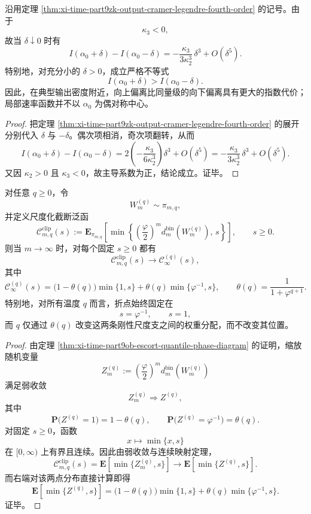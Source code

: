 \begin{corollary}[典型点附近的大偏差左右不对称性]\label{cor:xi-time-part9zk-local-rate-left-right-asymmetry}
沿用定理 \ref{thm:xi-time-part9zk-output-cramer-legendre-fourth-order} 的记号。由于
\[
\kappa_3<0,
\]
故当 \(\delta\downarrow 0\) 时有
\[
I(\alpha_0+\delta)-I(\alpha_0-\delta)
=
-\frac{\kappa_3}{3\kappa_2^3}\,\delta^3
+
O(\delta^5).
\]
特别地，对充分小的 \(\delta>0\)，成立严格不等式
\[
I(\alpha_0+\delta)>I(\alpha_0-\delta).
\]
因此，在典型输出密度附近，向上偏离比同量级的向下偏离具有更大的指数代价；局部速率函数并不以 \(\alpha_0\) 为偶对称中心。
\end{corollary}
\begin{proof}
把定理 \ref{thm:xi-time-part9zk-output-cramer-legendre-fourth-order} 的展开分别代入 \(\delta\) 与 \(-\delta\)。偶次项相消，奇次项翻转，从而
\[
I(\alpha_0+\delta)-I(\alpha_0-\delta)
=
2\left(-\frac{\kappa_3}{6\kappa_2^3}\right)\delta^3
+
O(\delta^5)
=
-\frac{\kappa_3}{3\kappa_2^3}\,\delta^3
+
O(\delta^5).
\]
又因 \(\kappa_2>0\) 且 \(\kappa_3<0\)，故主导系数为正，结论成立。证毕。
\end{proof}

\begin{theorem}\label{thm:xi-time-part9zk-escort-two-scale-clip-law}
对任意 \(q\ge 0\)，令
\[
W_m^{(q)}\sim \pi_{m,q},
\]
并定义尺度化截断泛函
\[
\mathcal C_{m,q}^{\mathrm{clip}}(s)
:=
\mathbf E_{\pi_{m,q}}\!\left[
\min\!\left\{
\left(\frac{\varphi}{2}\right)^m d_m^{\mathrm{bin}}(W_m^{(q)}),\,s
\right\}
\right],
\qquad
s\ge 0.
\]
则当 \(m\to\infty\) 时，对每个固定 \(s\ge 0\) 都有
\[
\mathcal C_{m,q}^{\mathrm{clip}}(s)
\longrightarrow
\mathcal C_\infty^{(q)}(s),
\]
其中
\[
\mathcal C_\infty^{(q)}(s)
=
\bigl(1-\theta(q)\bigr)\min\{1,s\}
+
\theta(q)\min\{\varphi^{-1},s\},
\qquad
\theta(q)=\frac{1}{1+\varphi^{q+1}}.
\]
特别地，对所有温度 \(q\) 而言，折点始终固定在
\[
s=\varphi^{-1},
\qquad
s=1,
\]
而 \(q\) 仅通过 \(\theta(q)\) 改变这两条刚性尺度支之间的权重分配，而不改变其位置。
\end{theorem}
\begin{proof}
由定理 \ref{thm:xi-time-part9ob-escort-quantile-phase-diagram} 的证明，缩放随机变量
\[
Z_m^{(q)}
:=
\left(\frac{\varphi}{2}\right)^m d_m^{\mathrm{bin}}(W_m^{(q)})
\]
满足弱收敛
\[
Z_m^{(q)}\Longrightarrow Z^{(q)},
\]
其中
\[
\mathbf P\bigl(Z^{(q)}=1\bigr)=1-\theta(q),
\qquad
\mathbf P\bigl(Z^{(q)}=\varphi^{-1}\bigr)=\theta(q).
\]
对固定 \(s\ge 0\)，函数
\[
x\longmapsto \min\{x,s\}
\]
在 \([0,\infty)\) 上有界且连续。因此由弱收敛与连续映射定理，
\[
\mathcal C_{m,q}^{\mathrm{clip}}(s)
=
\mathbf E\!\left[\min\{Z_m^{(q)},s\}\right]
\longrightarrow
\mathbf E\!\left[\min\{Z^{(q)},s\}\right].
\]
而右端对该两点分布直接计算即得
\[
\mathbf E\!\left[\min\{Z^{(q)},s\}\right]
=
\bigl(1-\theta(q)\bigr)\min\{1,s\}
+
\theta(q)\min\{\varphi^{-1},s\}.
\]
证毕。
\end{proof}

